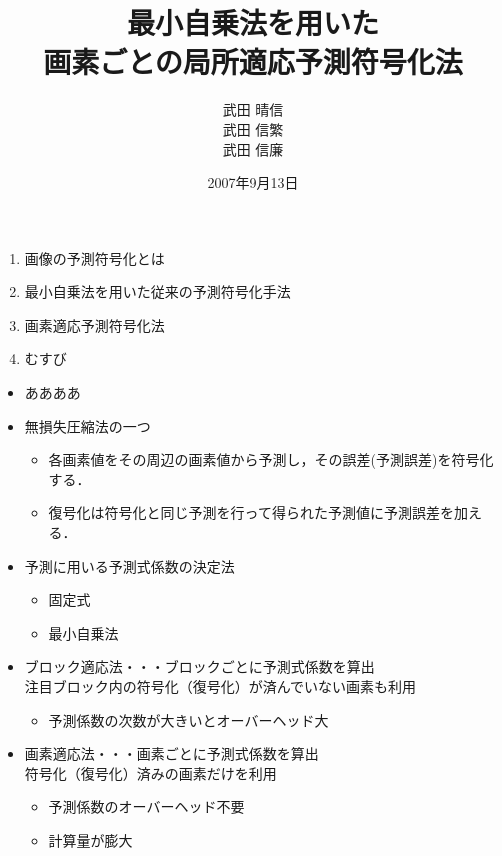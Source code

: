 \documentclass[25pt, landscape,dvipdfmx]{foils}
\title{\vspace{2cm}最小自乗法を用いた\\画素ごとの局所適応予測符号化法}
\date{2007年9月13日}
\author{
武田 晴信\\
武田 信繁\\
武田 信廉\\
}
\begin{document}
\maketitle
\begin{enumerate}
 \item 画像の予測符号化とは
 \item 最小自乗法を用いた従来の予測符号化手法
 \item 画素適応予測符号化法
 \item むすび
\end{enumerate}
      
\begin{itemize}
 \item ああああ
 \item 無損失圧縮法の一つ
       \begin{itemize}
        \item 各画素値をその周辺の画素値から予測し，その誤差(予測誤差)を符号化する．
        \item 復号化は符号化と同じ予測を行って得られた予測値に予測誤差を加える．
       \end{itemize}
 \item 予測に用いる予測式係数の決定法
 \begin{itemize}
  \item 固定式
  \item 最小自乗法
 \end{itemize}
\end{itemize}
\begin{itemize}
 \item {\large ブロック適応法・・・ブロックごとに予測式係数を算出}\\
       注目ブロック内の符号化（復号化）が済んでいない画素も利用
 \begin{itemize}
  \item 予測係数の次数が大きいとオーバーヘッド大
 \end{itemize}
 \item {\large 画素適応法・・・画素ごとに予測式係数を算出}\\
       符号化（復号化）済みの画素だけを利用
 \begin{itemize}
  \item 予測係数のオーバーヘッド不要
  \item 計算量が膨大
 \end{itemize}
\end{itemize}
\end{document}
